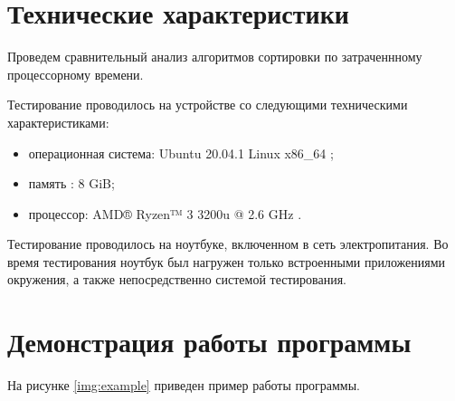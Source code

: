 \section{Технические характеристики}

Проведем сравнительный анализ алгоритмов сортировки по затраченнному процессорному времени.

Тестирование проводилось на устройстве со следующими техническими характеристиками:

\begin{itemize}
	\item операционная система: Ubuntu 20.04.1 Linux x86\_64 \cite{linux};
	\item память : 8 GiB;
	\item процессор: AMD® Ryzen™ 3 3200u @ 2.6 GHz \cite{amd}.
\end{itemize}

Тестирование проводилось на ноутбуке, включенном в сеть электропитания. Во время тестирования ноутбук был нагружен только встроенными приложениями окружения, а также непосредственно системой тестирования.

\clearpage

\section{Демонстрация работы программы}

На рисунке \ref{img:example} приведен пример работы программы.

